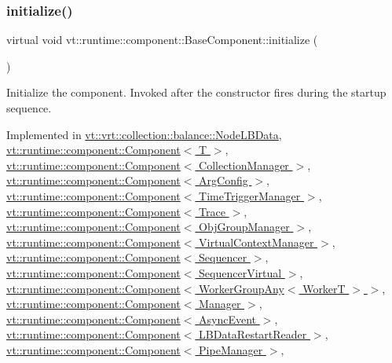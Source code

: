 \subsubsection{\texorpdfstring{initialize()}{initialize()}}
{\footnotesize\ttfamily virtual void vt\+::runtime\+::component\+::\+Base\+Component\+::initialize (\begin{DoxyParamCaption}{ }\end{DoxyParamCaption})\hspace{0.3cm}{\ttfamily [pure virtual]}}



Initialize the component. Invoked after the constructor fires during the startup sequence. 



Implemented in \hyperlink{structvt_1_1vrt_1_1collection_1_1balance_1_1_node_l_b_data_aa489e1252abac8237d30bb0110ad36f9}{vt\+::vrt\+::collection\+::balance\+::\+Node\+L\+B\+Data}, \hyperlink{structvt_1_1runtime_1_1component_1_1_component_a7f07384d294e59796add9ce6be2d6410}{vt\+::runtime\+::component\+::\+Component$<$ T $>$}, \hyperlink{structvt_1_1runtime_1_1component_1_1_component_a7f07384d294e59796add9ce6be2d6410}{vt\+::runtime\+::component\+::\+Component$<$ Collection\+Manager $>$}, \hyperlink{structvt_1_1runtime_1_1component_1_1_component_a7f07384d294e59796add9ce6be2d6410}{vt\+::runtime\+::component\+::\+Component$<$ Arg\+Config $>$}, \hyperlink{structvt_1_1runtime_1_1component_1_1_component_a7f07384d294e59796add9ce6be2d6410}{vt\+::runtime\+::component\+::\+Component$<$ Time\+Trigger\+Manager $>$}, \hyperlink{structvt_1_1runtime_1_1component_1_1_component_a7f07384d294e59796add9ce6be2d6410}{vt\+::runtime\+::component\+::\+Component$<$ Trace $>$}, \hyperlink{structvt_1_1runtime_1_1component_1_1_component_a7f07384d294e59796add9ce6be2d6410}{vt\+::runtime\+::component\+::\+Component$<$ Obj\+Group\+Manager $>$}, \hyperlink{structvt_1_1runtime_1_1component_1_1_component_a7f07384d294e59796add9ce6be2d6410}{vt\+::runtime\+::component\+::\+Component$<$ Virtual\+Context\+Manager $>$}, \hyperlink{structvt_1_1runtime_1_1component_1_1_component_a7f07384d294e59796add9ce6be2d6410}{vt\+::runtime\+::component\+::\+Component$<$ Sequencer $>$}, \hyperlink{structvt_1_1runtime_1_1component_1_1_component_a7f07384d294e59796add9ce6be2d6410}{vt\+::runtime\+::component\+::\+Component$<$ Sequencer\+Virtual $>$}, \hyperlink{structvt_1_1runtime_1_1component_1_1_component_a7f07384d294e59796add9ce6be2d6410}{vt\+::runtime\+::component\+::\+Component$<$ Worker\+Group\+Any$<$ Worker\+T $>$ $>$}, \hyperlink{structvt_1_1runtime_1_1component_1_1_component_a7f07384d294e59796add9ce6be2d6410}{vt\+::runtime\+::component\+::\+Component$<$ Manager $>$}, \hyperlink{structvt_1_1runtime_1_1component_1_1_component_a7f07384d294e59796add9ce6be2d6410}{vt\+::runtime\+::component\+::\+Component$<$ Async\+Event $>$}, \hyperlink{structvt_1_1runtime_1_1component_1_1_component_a7f07384d294e59796add9ce6be2d6410}{vt\+::runtime\+::component\+::\+Component$<$ L\+B\+Data\+Restart\+Reader $>$}, \hyperlink{structvt_1_1runtime_1_1component_1_1_component_a7f07384d294e59796add9ce6be2d6410}{vt\+::runtime\+::component\+::\+Component$<$ Pipe\+Manager $>$}, 
